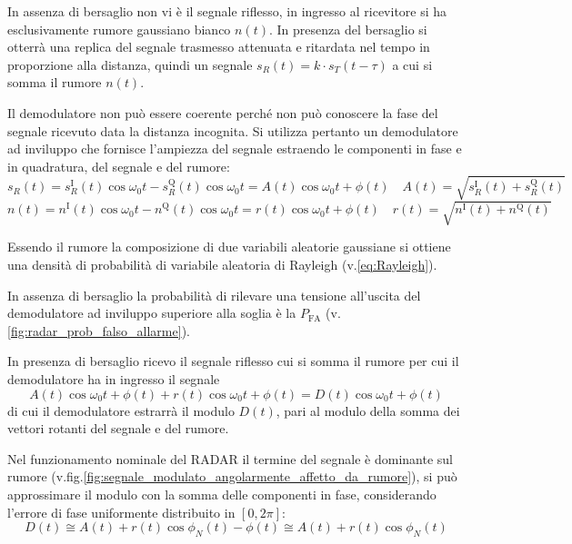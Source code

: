 In assenza di bersaglio non vi è il segnale riflesso, in ingresso al ricevitore si ha esclusivamente rumore gaussiano bianco $n(t)$.
In presenza del bersaglio si otterrà una replica del segnale trasmesso attenuata e ritardata nel tempo in proporzione alla distanza, quindi un segnale $s_R(t)=k\cdot s_T(t-\tau)$ a cui si somma il rumore $n(t)$.

Il demodulatore non può essere coerente perché non può conoscere la fase del segnale ricevuto data la distanza incognita. Si utilizza pertanto un demodulatore ad inviluppo che fornisce l'ampiezza del segnale estraendo le componenti in fase e in quadratura, del segnale e del rumore:
\begin{equation}
s_R(t)=s_R^\text{I}(t)\cos{\omega_0 t}-s_R^\text{Q}(t)\cos{\omega_0 t}=A(t)\cos{\omega_0 t+\phi(t)}\quad A(t)=\sqrt{s_R^\text{I}(t)+s_R^\text{Q}(t)}
\end{equation}
\begin{equation}
n(t)=n^\text{I}(t)\cos{\omega_0 t}-n^\text{Q}(t)\cos{\omega_0 t}=r(t)\cos{\omega_0 t+\phi(t)}\quad r(t)=\sqrt{n^\text{I}(t)+n^\text{Q}(t)}
\end{equation}

Essendo il rumore la composizione di due variabili aleatorie gaussiane si ottiene una densità di probabilità di variabile aleatoria di Rayleigh (v.\ref{eq:Rayleigh}). 

In assenza di bersaglio la probabilità di rilevare una tensione all'uscita del demodulatore ad inviluppo superiore alla soglia è la  $P_\text{FA}$ (v.\ref{fig:radar_prob_falso_allarme}).

In presenza di bersaglio ricevo il segnale riflesso cui si somma il rumore per cui il demodulatore ha in ingresso il segnale
\begin{equation}
A(t)\cos{\omega_0 t+\phi(t)}+r(t)\cos{\omega_0 t+\phi(t)}=D(t)\cos{\omega_0 t+\phi(t)}
\end{equation}
di cui il demodulatore estrarrà il modulo $D(t)$, pari al modulo della somma dei vettori rotanti del segnale e del rumore. 

Nel funzionamento nominale del \ac{RADAR} il termine del segnale è dominante sul rumore (v.fig.\ref{fig:segnale_modulato_angolarmente_affetto_da_rumore}), si può approssimare il modulo con la somma delle componenti in fase, considerando l'errore di fase uniformente distribuito in $[0,2\pi]$:
\[D(t)\cong A(t)+r(t)\cos{\phi_N(t)-\phi(t)}\cong A(t)+r(t)\cos{\phi_N(t)}\]

